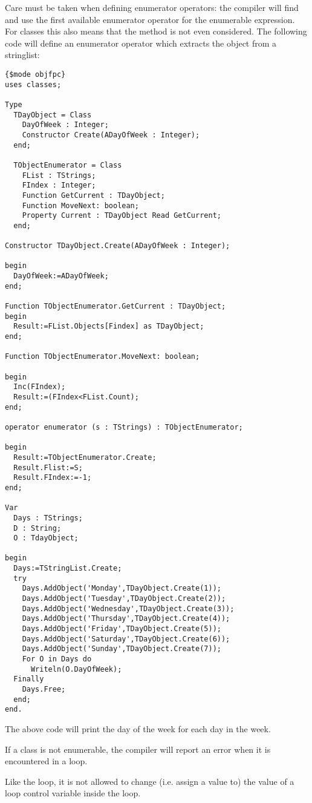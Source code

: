Care must be taken when defining enumerator operators: the compiler will
find and use the first available enumerator operator for the enumerable
expression. For classes this also means that the  method
is not even considered. The following code will define an enumerator 
operator which extracts the object from a stringlist:
\begin{verbatim}
{$mode objfpc}
uses classes;

Type
  TDayObject = Class
    DayOfWeek : Integer;
    Constructor Create(ADayOfWeek : Integer);
  end;

  TObjectEnumerator = Class
    FList : TStrings;
    FIndex : Integer;
    Function GetCurrent : TDayObject;
    Function MoveNext: boolean;
    Property Current : TDayObject Read GetCurrent;
  end;  

Constructor TDayObject.Create(ADayOfWeek : Integer);

begin
  DayOfWeek:=ADayOfWeek;
end;

Function TObjectEnumerator.GetCurrent : TDayObject;
begin
  Result:=FList.Objects[Findex] as TDayObject;
end;

Function TObjectEnumerator.MoveNext: boolean;

begin
  Inc(FIndex);
  Result:=(FIndex<FList.Count);
end;
  
operator enumerator (s : TStrings) : TObjectEnumerator;

begin
  Result:=TObjectEnumerator.Create;
  Result.Flist:=S;
  Result.FIndex:=-1;
end;

Var
  Days : TStrings;
  D : String;
  O : TdayObject;
  
begin
  Days:=TStringList.Create;
  try
    Days.AddObject('Monday',TDayObject.Create(1));
    Days.AddObject('Tuesday',TDayObject.Create(2));
    Days.AddObject('Wednesday',TDayObject.Create(3));
    Days.AddObject('Thursday',TDayObject.Create(4));
    Days.AddObject('Friday',TDayObject.Create(5));
    Days.AddObject('Saturday',TDayObject.Create(6));
    Days.AddObject('Sunday',TDayObject.Create(7));
    For O in Days do  
      Writeln(O.DayOfWeek);
  Finally
    Days.Free;
  end;
end.  
\end{verbatim}
The above code will print the day of the week for each day in the week.

If a class is not enumerable, the compiler will report an error when it is
encountered in a  loop.

\begin{remark}
Like the  loop, it is not allowed to change (i.e. assign a value to) the value of a 
loop control variable inside the loop.
\end{remark}


